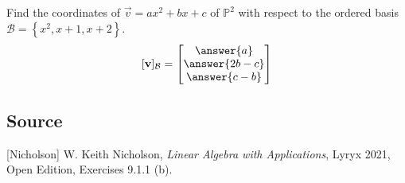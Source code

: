 \documentclass{ximera}
\author{}
\begin{document}
\begin{exercise}
Find the coordinates of $\vec{v}=ax^2+bx+c$ of $\mathbb{P}^2$ with respect to the ordered basis $\mathcal{B}=\left\{x^2, x+1, x+2\right\}$.
$$[\vec{v}]_{\mathcal{B}}=\begin{bmatrix}\answer{a}\\\answer{2b-c}\\\answer{c-b}\end{bmatrix}$$

 \end{exercise}

\subsection*{Source}
[Nicholson] W. Keith Nicholson, {\it Linear Algebra with Applications}, Lyryx 2021, Open Edition, Exercises 9.1.1 (b).  
\end{document}
